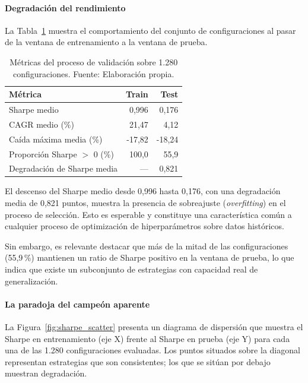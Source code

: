 \paragraph{Degradación del rendimiento}

La Tabla~\ref{tab:degradacion} muestra el comportamiento del conjunto de configuraciones al pasar de la ventana
de entrenamiento a la ventana de prueba.

\begin{table}[H]
\centering
\begin{tabular}{lrr}
\toprule
\textbf{Métrica} & \textbf{Train} & \textbf{Test} \\
\midrule
Sharpe medio                & 0,996   & 0,176    \\
CAGR medio (\%)             & 21,47   & 4,12     \\
Caída máxima media (\%)     & -17,82  & -18,24   \\
Proporción Sharpe $>$ 0 (\%)& 100,0   & 55,9     \\
Degradación de Sharpe media & ---     & 0,821    \\
\bottomrule
\end{tabular}
\caption{Métricas del proceso de validación sobre
1.280 configuraciones. Fuente: Elaboración propia.}
\label{tab:degradacion}
\end{table}

El descenso del Sharpe medio desde 0,996 hasta 0,176, con una
degradación media de 0,821 puntos, muestra la presencia de
sobreajuste (\textit{overfitting}) en el proceso
de selección. Esto es esperable y constituye una
característica común a cualquier proceso de optimización de
hiperparámetros sobre datos históricos.

Sin embargo, es relevante destacar que más de la mitad de las
configuraciones (55,9\,\%) mantienen un ratio de Sharpe positivo
en la ventana de prueba, lo que indica que existe un subconjunto de
estrategias con capacidad real de generalización.

\paragraph{La paradoja del campeón aparente}

La Figura~\ref{fig:sharpe_scatter} presenta un diagrama de
dispersión que muestra el Sharpe en entrenamiento (eje X)
frente al Sharpe en prueba (eje Y) para cada una de las 1.280
configuraciones evaluadas. Los puntos situados sobre la diagonal
representan estrategias que son consistentes; los que se
sitúan por debajo muestran degradación.

